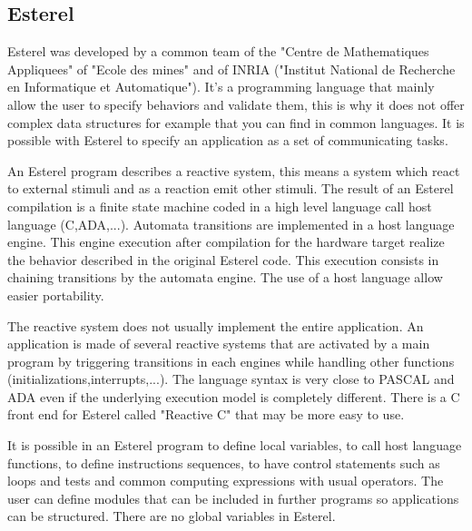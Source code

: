 \documentclass[10pt]{report}
\begin{document}
\subsection{Esterel}

Esterel was developed by a common team of the "Centre de Mathematiques Appliquees" of "Ecole des mines" and of INRIA ("Institut
National de Recherche en Informatique et Automatique"). It's a programming language that mainly allow the user to specify
behaviors and validate them, this is why it does not offer complex data structures for example that you can find in common
languages. It is possible with Esterel to specify an application as a set of communicating tasks.

An Esterel program describes a reactive system, this means a system which react to external stimuli and as a reaction emit other
stimuli. The result of an Esterel compilation is a finite state machine coded in a high level language call host language (C,ADA,...).
Automata transitions are implemented in a host language engine. This engine execution after compilation for the hardware target
realize the behavior described in the original Esterel code. This execution consists in chaining transitions by the automata engine.
The use of a host language allow easier portability.

The reactive system does not usually implement the entire application. An application is made of several reactive systems that are
activated by a main program by triggering transitions in each engines while handling other functions (initializations,interrupts,...).
The language syntax is very close to PASCAL and ADA even if the underlying execution model is completely different. There is
a C front end for Esterel called "Reactive C" that may be more easy to use.

It is possible in an Esterel program to define local variables, to call host language functions, to define instructions sequences,
to have control statements such as loops and tests and common computing expressions with usual operators. The user can define modules
that can be included in further programs so applications can be structured. There are no global variables in Esterel.
\end{document}
